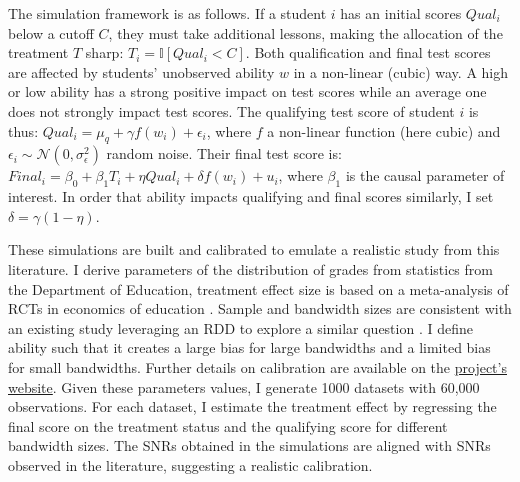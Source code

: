 \documentclass[usletter, 12pt]{article}
\begin{document}
        			 The simulation framework is as follows. If a student $i$ has an initial scores $Qual_{i}$ below a cutoff $C$, they must take additional lessons, making the allocation of the treatment $T$ sharp: $T_i = \mathbb{I}[Qual_{i} < C]$. Both qualification and final test scores are affected by students' unobserved ability $w$ in a non-linear (cubic) way. A high or low ability has a strong positive impact on test scores while an average one does not strongly impact test scores. The qualifying test score of student $i$ is thus: $Qual_{i} = \mu_q + \gamma f(w_i) + \epsilon_{i}$, where $f$ a non-linear function (here cubic) and $\epsilon_{i} \sim \mathcal{N}(0, \sigma_{\epsilon}^{2})$ random noise. Their final test score is: $Final_{i} = \beta_{0} + \beta_{1} T_i + \eta Qual_{i} +  \delta f(w_i) + u_{i}$, where $\beta_{1}$ is the causal parameter of interest. In order that ability impacts qualifying and final scores similarly, I set $\delta = \gamma (1 - \eta)$.
        
        			These simulations are built and calibrated to emulate a realistic study from this literature. I derive parameters of the distribution of grades from statistics from the Department of Education,  treatment effect size is based on a meta-analysis of RCTs in economics of education  \citep{kraft_interpreting_2020}. Sample and bandwidth sizes are consistent with an existing study leveraging an RDD to explore a similar question \citep{jacob_remedial_2004}. 
			I define ability such that it creates a large bias for large bandwidths and a limited bias for small bandwidths. Further details on calibration are available on the \href{https://vincentbagilet.github.io/causal_exaggeration/RDD.html#calibration-and-baseline-parameters-values}{project's website}. Given these parameters values, I generate 1000 datasets with 60,000 observations. For each dataset, I estimate the treatment effect by regressing the final score on the treatment status and the qualifying score for different bandwidth sizes. The SNRs obtained in the simulations are aligned with SNRs observed in the literature, suggesting a realistic calibration.
				
\end{document}
